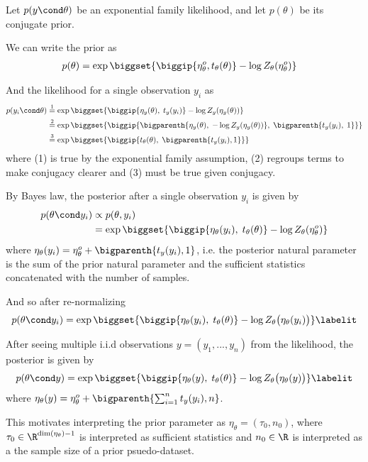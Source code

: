 Let $p(y \cond \theta)$ be an exponential family likelihood, and let $p(\theta)$ be its conjugate prior. 

We can write the prior as 
\begin{align*}
p(\theta ) &= \exp \biggset{\biggip{\eta_\theta^o, t_\theta (\theta)} - \log Z_\theta(\eta_\theta^o)} 
\end{align*}

And the likelihood for a single observation $y_i$ as 
\begin{align*}
p(y_i \cond \theta)  & \stackrel{1}{=} \exp \biggset{ \biggip{\eta_y(\theta), \;  t_y(y_i)} - \log Z_y (\eta_y(\theta)) } \\
& \stackrel{2}{=} \exp \biggset{ \biggip{ \bigparenth{\eta_y(\theta), \; - \log Z_y (\eta_y(\theta))}, \; \bigparenth{t_y(y_i), \; 1}}  } \\
& \stackrel{3}{=} \exp \biggset{ \biggip{t_\theta(\theta), \; \bigparenth{t_y(y_i),1}}}   
\end{align*}
where (1) is true by the exponential family assumption, (2) regroups terms to make conjugacy clearer and (3) must be true given conjugacy. 


By Bayes law, the posterior after a single observation $y_i$ is given by
\begin{align*}
p(\theta \cond y_i)  &\propto p(\theta, y_i) \\
	&=\exp \biggset{ \biggip{ \eta_\theta(y_i), \;   t_\theta(\theta) }- \log Z_\theta(\eta_\theta^o)} 
\end{align*}
where $\eta_\theta(y_i) = \eta_\theta^o + \bigparenth{t_y(y_i),1}$, i.e. the posterior natural parameter is the sum of the prior natural parameter and the sufficient statistics concatenated with the number of samples. 

And so after re-normalizing
\begin{align*}
p(\theta \cond y_i)  = \exp \biggset{ \biggip{ \eta_\theta(y_i), \;   t_\theta(\theta) } - \log Z_\theta \big(\eta_\theta(y_i)\big)}
\labelit \label{eqn:posterior_for_exponential_family_after_one_obs} 
\end{align*}
  
After seeing multiple i.i.d observations $y=(y_1,...,y_n)$ from the likelihood, the posterior is given by
\begin{align*}
p(\theta \cond y)  = \exp \biggset{ \biggip{ \eta_\theta(y), \;   t_\theta(\theta) } - \log Z_\theta \big(\eta_\theta(y)\big)} 
\labelit \label{eqn:posterior_for_exponential_family_after_many_obs} 
\end{align*}
where $\eta_\theta(y) = \eta_\theta^o + \bigparenth{ \sum_{i=1}^n t_y(y_i),n}$.

This motivates interpreting the prior parameter as $\eta_\theta = (\tau_0, n_0)$, where $\tau_0 \in \R^{\dim(\eta_\theta) - 1}$ is interpreted as sufficient statistics and $n_0 \in \R$ is interpreted as a the sample size of a prior psuedo-dataset. 

